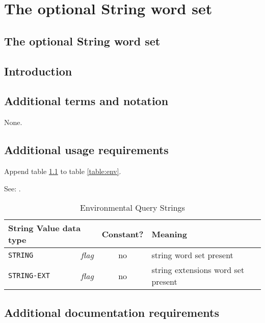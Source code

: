 \chapter{The optional String word set} %

\begin{info}
\section{The optional String word set}
\end{info}

\section{Introduction} %

\section{Additional terms and notation} %

None.

\section{Additional usage requirements} %

Append table \ref{string:env} to table \ref{table:env}.

See: .

\begin{table}[ht]
  \begin{center}
	\caption{Environmental Query Strings}
	\label{string:env}
	\begin{tabular}{p{9em}rcp{}}
		\hline\hline
		\multicolumn{2}{l}{String \hfill Value data type} & Constant? & Meaning \\
		\hline
		\texttt{STRING}		& \emph{flag}	& no	&
			string word set present \\
		\texttt{STRING-EXT}	& \emph{flag}	& no	&
			string extensions word set present \\
		\hline\hline
	\end{tabular}
  \end{center}
\end{table}

\section{Additional documentation requirements} %

